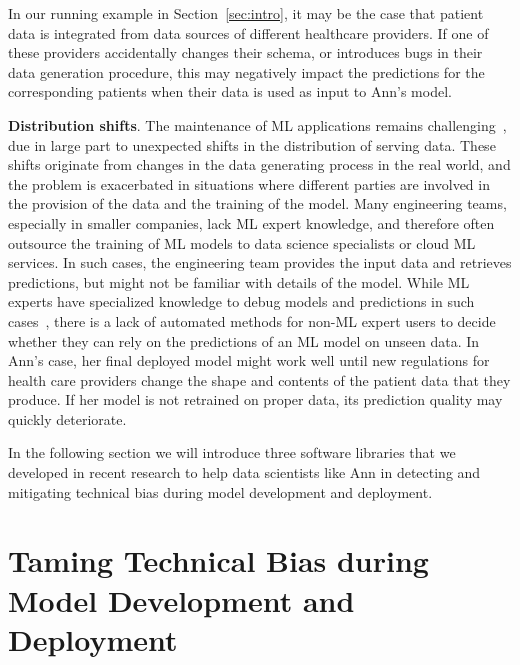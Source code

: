 \documentclass[11pt]{article}
\newcommand{\header}[1]{\vspace{1mm}\noindent\textbf{#1}.}
\begin{document}
In our running example in Section~\ref{sec:intro}, it may be the case that  patient data is integrated from data sources of different healthcare providers. If one of these providers accidentally changes their schema, or introduces bugs in their data generation procedure, this may negatively impact the predictions for the corresponding patients when their data is used as input to Ann's model. 

\header{Distribution shifts} The maintenance of ML applications remains challenging~\cite{Polyzotis2018}, due in large part to unexpected shifts in the distribution of serving data. These shifts originate from changes in the data generating process in the real world, and the problem is exacerbated in situations where different parties are involved in the provision of the data and the training of the model. Many engineering teams, especially in smaller companies, lack ML expert knowledge, and therefore often outsource the training of ML models to data science specialists or cloud ML services. In such cases, the engineering team provides the input data and retrieves predictions, but might not be familiar with details of the model. While ML experts have specialized knowledge to debug models and predictions in such cases~\cite{lipton2018detecting}, there is a lack of automated methods for non-ML expert users to decide whether they can rely on the predictions of an ML model on unseen data. In Ann's case, her final deployed model might work well until new regulations for health care providers change the shape and contents of the patient data that they produce. If her model is not retrained on proper data, its prediction quality may quickly deteriorate.


In the following section we will introduce three  software libraries that we developed in recent research to help data scientists like Ann in detecting and mitigating technical bias during model development and deployment.


\section{Taming Technical Bias during Model Development and Deployment}
\label{sec:fairprep}
\end{document}
